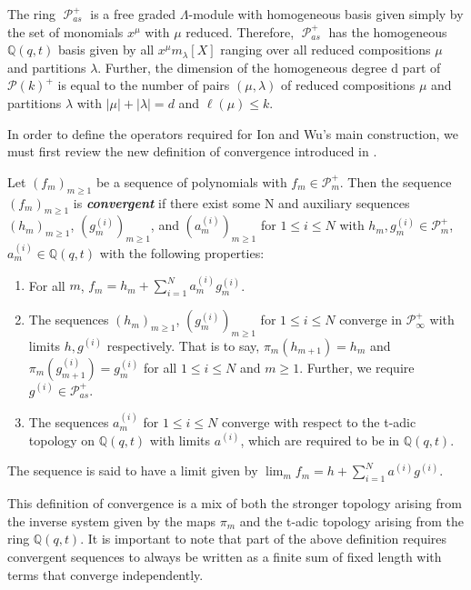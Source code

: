 \documentclass[ALCO,Unicode]{cedram}
\DeclareMathOperator{\sP}{\mathscr{P} }
\begin{document}
The ring $\sP_{as}^{+}$ is a free graded $\Lambda$-module with homogeneous basis given simply by the set of monomials $x^{\mu}$ with $\mu$ reduced. Therefore, $\sP_{as}^{+}$ has the homogeneous $\mathbb{Q}(q,t)$ basis given by all $x^{\mu}m_{\lambda}[X]$ ranging over all reduced compositions $\mu$ and partitions $\lambda$. Further, the dimension of the homogeneous degree d part of $\mathscr{P}(k)^{+}$ is equal to the number of pairs $(\mu,\lambda)$ of reduced compositions $\mu$ and partitions $\lambda$ with $|\mu|+|\lambda| = d$ and $\ell(\mu) \leq k$. 
 
In order to define the operators required for Ion and Wu's main construction, we must first review the new definition of convergence introduced in \cite{Ion_2022}. 

 \begin{defi}\label{defn6}
 Let $(f_m)_{m \geq 1}$ be a sequence of polynomials with $f_m \in \mathscr{P}_m^{+}$. Then the sequence $(f_m)_{m \geq 1}$ is \textbf{\textit{convergent}} if there exist some N and auxiliary sequences $(h_m)_{m\geq1}$, $(g^{(i)}_m)_{m\geq 1}$, and $(a^{(i)}_m)_{m\geq 1}$ for $1\leq i \leq N$ with $h_m, g^{(i)}_m \in \mathscr{P}_{m}^{+}$, $a^{(i)}_m \in \mathbb{Q}(q,t)$ with the following properties:

\begin{enumerate}
    \item For all $m$, $f_m = h_m + \sum_{i=1}^{N} a^{(i)}_m g^{(i)}_m$.
    \item The sequences $(h_m)_{m\geq1}$, $(g^{(i)}_m)_{m\geq1}$ for $1\leq i \leq N$ converge in $\mathscr{P}_{\infty}^{+}$ with limits $h,g^{(i)}$ respectively. That is to say, $\pi_m(h_{m+1}) = h_m$ and $\pi_m(g_{m+1}^{(i)}) = g_{m}^{(i)}$ for all $1\leq i \leq N$ and $m \geq 1$. Further, we require $g^{(i)} \in \mathscr{P}_{as}^{+}$.
    \item The sequences $a^{(i)}_m$ for $1\leq i \leq N$ converge with respect to the t-adic topology on $\mathbb{Q}(q,t)$ with limits $a^{(i)}$, which are required to be in $\mathbb{Q}(q,t)$.
\end{enumerate}

The sequence is said to have a limit given by
$\lim_{m} f_m = h + \sum_{i=1}^{N}a^{(i)}g^{(i)}.$

\end{defi}

This definition of convergence is a mix of both the stronger topology arising from the inverse system given by the maps $\pi_m$ and the t-adic topology arising from the ring $\mathbb{Q}(q,t)$. It is important to note that part of the above definition requires convergent sequences to always be written as a finite sum of fixed length with terms that converge independently. 
\end{document}
